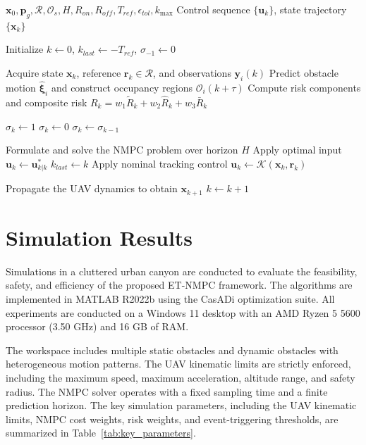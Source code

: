 \documentclass[lettersize,journal]{IEEEtran}
\newcommand{\vect}[1]{\boldsymbol{#1}}
\begin{document}
\begin{algorithm}[!h]
	\caption{Event-Triggered Dual-Mode NMPC for Dynamic Obstacle Avoidance}
	\label{alg:etpp}
	\begin{algorithmic}[1]
		\REQUIRE $\vect{x}_0, \vect{p}_g, \mathcal{R}, \mathcal{O}_s, H, R_{on}, R_{off}, T_{ref}, \epsilon_{tol}, k_{\max}$
		\ENSURE Control sequence $\{\vect{u}_k\}$, state trajectory $\{\vect{x}_k\}$
		
		\STATE Initialize $k \leftarrow 0$, $k_{last} \leftarrow -T_{ref}$, $\sigma_{-1} \leftarrow 0$
		
		\WHILE{$\|\vect{p}_k - \vect{p}_g\| > \epsilon_{tol} \wedge k < k_{\max}$}
		
		\STATE Acquire state $\vect{x}_k$, reference $\vect{r}_k \in \mathcal{R}$, and observations $\vect{y}_i(k)$
		\STATE Predict obstacle motion $\hat{\vect{\xi}}_i$ and construct occupancy regions $\mathcal{O}_i(k+\tau)$
		\STATE Compute risk components and composite risk $R_k = w_1\tilde{R}_k + w_2\hat{R}_k + w_3\bar{R}_k$
		
		\STATE $\sigma_k \leftarrow 1$
		\STATE $\sigma_k \leftarrow 0$
		\ELSE
		\STATE $\sigma_k \leftarrow \sigma_{k-1}$
		\ENDIF
		
		\STATE Formulate and solve the NMPC problem over horizon $H$
		\STATE Apply optimal input $\vect{u}_k \leftarrow \vect{u}_{k|k}^\ast$
		\STATE $k_{last} \leftarrow k$
		\ELSE
		\STATE Apply nominal tracking control $\vect{u}_k \leftarrow \mathcal{K}(\vect{x}_k, \vect{r}_k)$
		\ENDIF
		
		\STATE Propagate the UAV dynamics to obtain $\vect{x}_{k+1}$
		\STATE $k \leftarrow k+1$
		\ENDWHILE
	\end{algorithmic}
\end{algorithm}

\section{Simulation Results}
Simulations in a cluttered urban canyon are conducted to evaluate the feasibility, safety, and efficiency of the proposed ET-NMPC framework. The algorithms are implemented in MATLAB R2022b using the CasADi optimization suite. All experiments are conducted on a Windows 11 desktop with an AMD Ryzen 5 5600 processor (3.50 GHz) and 16 GB of RAM.

The workspace includes multiple static obstacles and dynamic obstacles with heterogeneous motion patterns. The UAV kinematic limits are strictly enforced, including the maximum speed, maximum acceleration, altitude range, and safety radius. The NMPC solver operates with a fixed sampling time and a finite prediction horizon. The key simulation parameters, including  the UAV kinematic limits, NMPC cost weights, risk weights, and event-triggering thresholds, are summarized in Table~\ref{tab:key_parameters}.
\end{document}
